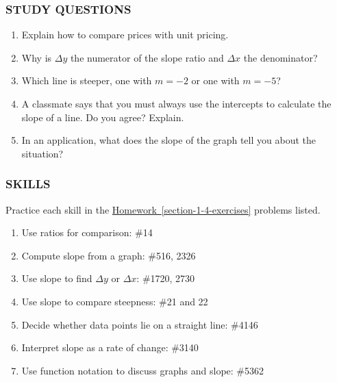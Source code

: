 \documentclass[10pt,]{book}
\theoremstyle{plain}
\theoremstyle{definition}
\theoremstyle{definition}
\theoremstyle{definition}
\theoremstyle{definition}
\numberwithin{equation}{part}
\begin{document}
\subsubsection[{STUDY QUESTIONS}]{STUDY QUESTIONS}\label{subsubsection-15}
\leavevmode%
\begin{enumerate}[label=\arabic*]
\item\hypertarget{li-921}{}Explain how to compare prices with unit pricing.%
\item\hypertarget{li-922}{}Why is \(\Delta y\) the numerator of the slope ratio and \(\Delta x\) the denominator?%
\item\hypertarget{li-923}{}Which line is steeper, one with \(m = -2\) or one with \(m = -5\)?%
\item\hypertarget{li-924}{}A classmate says that you must always use the intercepts to calculate the slope of a line. Do you agree? Explain.%
\item\hypertarget{li-925}{}In an application, what does the slope of the graph tell you about the situation?%
\end{enumerate}
%
\typeout{************************************************}
\typeout{************************************************}
\subsubsection[{SKILLS}]{SKILLS}\label{subsubsection-16}
Practice each skill in the \hyperref[section-1-4-exercises]{Homework~\ref{section-1-4-exercises}} problems listed. \leavevmode%
\begin{enumerate}[label=\arabic*]
\item\hypertarget{li-926}{}Use ratios for comparison: \#1\textendash{}4%
\item\hypertarget{li-927}{}Compute slope from a graph: \#5\textendash{}16, 23\textendash{}26%
\item\hypertarget{li-928}{}Use slope to find \(\Delta y\) or \(\Delta x\): \#17\textendash{}20, 27\textendash{}30%
\item\hypertarget{li-929}{}Use slope to compare steepness: \#21 and 22%
\item\hypertarget{li-930}{}Decide whether data points lie on a straight line: \#41\textendash{}46%
\item\hypertarget{li-931}{}Interpret slope as a rate of change: \#31\textendash{}40%
\item\hypertarget{li-932}{}Use function notation to discuss graphs and slope: \#53\textendash{}62%
\end{enumerate}
%
\typeout{************************************************}
\typeout{************************************************}
\end{document}
